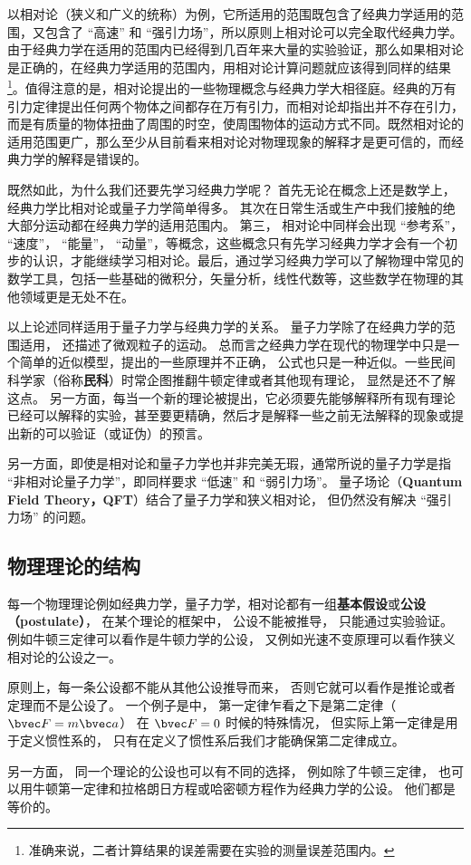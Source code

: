 以相对论（狭义和广义的统称）为例，它所适用的范围既包含了经典力学适用的范围，又包含了 “高速” 和 “强引力场”，所以原则上相对论可以完全取代经典力学。由于经典力学在适用的范围内已经得到几百年来大量的实验验证，那么如果相对论是正确的，在经典力学适用的范围内，用相对论计算问题就应该得到同样的结果\footnote{准确来说，二者计算结果的误差需要在实验的测量误差范围内。}。值得注意的是，相对论提出的一些物理概念与经典力学大相径庭。经典的万有引力定律提出任何两个物体之间都存在万有引力，而相对论却指出并不存在引力，而是有质量的物体扭曲了周围的时空，使周围物体的运动方式不同。既然相对论的适用范围更广，那么至少从目前看来相对论对物理现象的解释才是更可信的，而经典力学的解释是错误的。 

既然如此，为什么我们还要先学习经典力学呢？ 首先无论在概念上还是数学上，经典力学比相对论或量子力学简单得多。 其次在日常生活或生产中我们接触的绝大部分运动都在经典力学的适用范围内。 第三， 相对论中同样会出现 “参考系”， “速度”， “能量”， “动量”，等概念，这些概念只有先学习经典力学才会有一个初步的认识，才能继续学习相对论。最后，通过学习经典力学可以了解物理中常见的数学工具，包括一些基础的微积分，矢量分析，线性代数等，这些数学在物理的其他领域更是无处不在。

以上论述同样适用于量子力学与经典力学的关系。 量子力学除了在经典力学的范围适用， 还描述了微观粒子的运动。 总而言之经典力学在现代的物理学中只是一个简单的近似模型，提出的一些原理并不正确， 公式也只是一种近似。一些民间科学家（俗称\textbf{民科}）时常企图推翻牛顿定律或者其他现有理论， 显然是还不了解这点。 另一方面，每当一个新的理论被提出，它必须要先能够解释所有现有理论已经可以解释的实验，甚至要更精确，然后才是解释一些之前无法解释的现象或提出新的可以验证（或证伪）的预言。

另一方面，即使是相对论和量子力学也并非完美无瑕，通常所说的量子力学是指 “非相对论量子力学”，即同样要求 “低速” 和 “弱引力场”。 量子场论（\textbf{Quantum Field Theory，QFT}）结合了量子力学和狭义相对论， 但仍然没有解决 “强引力场” 的问题。

\subsection{物理理论的结构}
每一个物理理论例如经典力学，量子力学，相对论都有一组\textbf{基本假设}或\textbf{公设（postulate）}， 在某个理论的框架中， 公设不能被推导， 只能通过实验验证。 例如牛顿三定律可以看作是牛顿力学的公设， 又例如光速不变原理可以看作狭义相对论的公设之一。

原则上，每一条公设都不能从其他公设推导而来， 否则它就可以看作是推论或者定理而不是公设了。 一个例子是中， 第一定律乍看之下是第二定律（$\bvec F = m\bvec a$） 在 $\bvec F = 0$ 时候的特殊情况， 但实际上第一定律是用于定义惯性系的， 只有在定义了惯性系后我们才能确保第二定律成立。

另一方面， 同一个理论的公设也可以有不同的选择， 例如除了牛顿三定律， 也可以用牛顿第一定律和拉格朗日方程或哈密顿方程作为经典力学的公设。 他们都是等价的。
